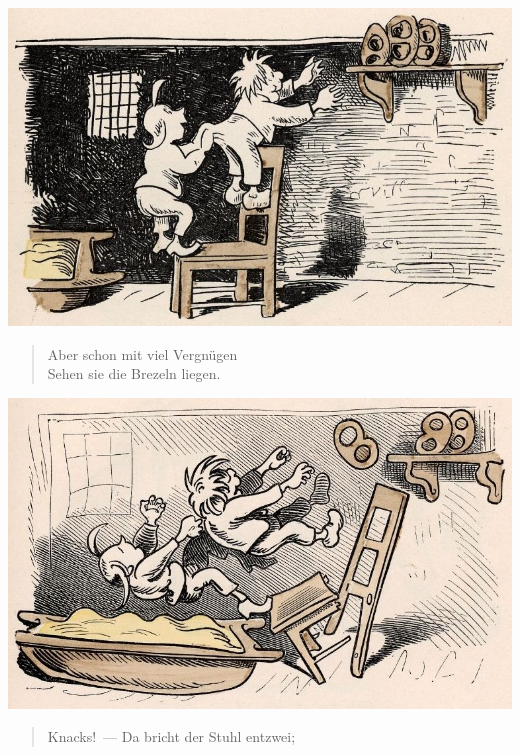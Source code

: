 \documentclass[a4paper,12pt]{article}
\begin{document}
\begin{center}\includegraphics[scale=.7, alt={Auf den Stuhl}]{images/6-06.jpg}\end{center}



\begin{verse}
Aber schon mit viel Vergnügen\\{}
Sehen sie die Brezeln liegen.
\end{verse}



\begin{center}\includegraphics[scale=.7, alt={... der bricht entzwei}]{images/6-07.jpg}\end{center}



\begin{verse}
Knacks!~— Da bricht der Stuhl entzwei;
\end{verse}
\end{document}
